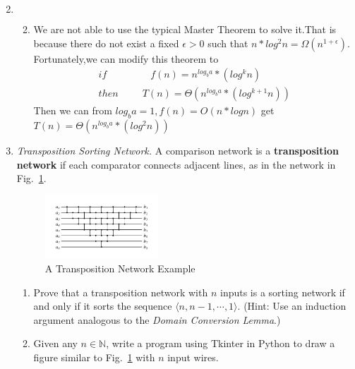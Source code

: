 \documentclass[12pt,a4paper]{article}
\makeatletter
\newtheorem*{solution}{Solution}
\theoremstyle{definition}
\renewenvironment{solution}[1][Solution] {\par\pushQED{\qed}\normalfont\topsep6\p@\@plus6\p@\relax\trivlist\item[\hskip\labelsep\bfseries#1\@addpunct{.}]\ignorespaces}{\popQED\endtrivlist\@endpefalse} \makeatother
\makeatother
\begin{document}
\begin{enumerate}
\begin{solution}
\begin{enumerate}
\begin{equation}
\end{equation}
\item We are not able to use the typical Master Theorem to solve it.That is because there do not exist a fixed $\epsilon>0$  such that $n*log^2n=\Omega(n^{1+\epsilon})$.
\\Fortunately,we can modify this theorem to 
\begin{equation}
\begin{aligned}
    if~~~~~~~~~~~~~~~~~~~~f(n)=n^{log_b a}*(log^k n)\\
    then~~~~~~~~~~~T(n)=\Theta(n^{log_b a}*(log^{k+1} n))
\end{aligned}
\end{equation}
Then we can from $log_b a=1,f(n)=O(n*logn)$ get $T(n)=\Theta(n^{log_b a}*(log^{2} n))$
\end{enumerate}
\end{solution}
\item
\textit{Transposition Sorting Network.} A comparison network is a \textbf{transposition network}  if each comparator connects adjacent lines, as in the network in Fig.~\ref{Fig-Transposition}.

\begin{figure}[htbp]
    \centering
    \includegraphics[width=0.4\textwidth]{Fig-Transposition.pdf}
    \caption{A Transposition Network Example}\label{Fig-Transposition}
\end{figure}

\begin{enumerate}
\item Prove that a transposition network with $n$ inputs is a sorting network if and only if it sorts the sequence $\langle n, n-1, \cdots, 1 \rangle$. {\color{blue}(Hint: Use an induction argument analogous to the \emph{Domain Conversion Lemma}.)}
\item {\color{red}{(Optional Sub-question with Bonus)}} Given any $n \in \mathbb{N}$, write a program using Tkinter in Python to draw a figure similar to Fig.~\ref{Fig-Transposition} with $n$ input wires.
\end{enumerate}


\end{enumerate}
\end{document}

